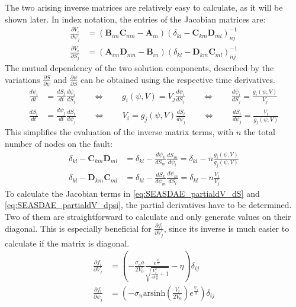\documentclass{report}
\begin{document}
The two arising inverse matrices are relatively easy to calculate, as it will be shown later. In index notation, the entries of the Jacobian matrices are:
\begin{align}
	\frac{\partial V_i}{\partial \psi_j} &= \left(\mathbf{B}_{im}\mathbf{C}_{mn}-\mathbf{A}_{in}\right)\left(\delta_{kl} - \mathbf{C}_{km}\mathbf{D}_{ml}\right)_{nj}^{-1} \\
	\frac{\partial V_i}{\partial S_j} &= \left(\mathbf{A}_{im}\mathbf{D}_{mn}-\mathbf{B}_{in}\right)\left(\delta_{kl} - \mathbf{D}_{km}\mathbf{C}_{ml}\right)_{nj}^{-1}
\end{align}
The mutual dependency of the two solution components, described by the variations $\frac{\partial S}{\partial \psi}$ and $\frac{\partial \psi}{\partial S}$ can be obtained using the respective time derivatives.
\begin{align}
\frac{d\psi_i}{dt} &= \frac{dS_j}{dt}\frac{d\psi_i}{dS_j} \qquad\Leftrightarrow\qquad g_i(\psi, V) = V_j \frac{d\psi_i}{dS_j} \qquad\Leftrightarrow\qquad \frac{d\psi_i}{dS_j} = \frac{g_i(\psi, V)}{V_j} \\
\frac{dS_i}{dt} &= \frac{d\psi_j}{dt}\frac{dS_i}{d\psi_j} \qquad\Leftrightarrow\qquad V_i = g_j(\psi, V) \frac{dS_i}{d\psi_j} \qquad\Leftrightarrow\qquad  \frac{dS_i}{d\psi_j} = \frac{V_i}{g_j(\psi, V)}
\end{align}
This simplifies the evaluation of the inverse matrix terms, with $n$ the total number of nodes on the fault: 
\begin{align}
	\delta_{kl} - \mathbf{C}_{km}\mathbf{D}_{ml} &= \delta_{kl} - \frac{d\psi_k}{dS_m}\frac{dS_m}{d\psi_l} = \delta_{kl} - n\frac{g_i(\psi,V)}{g_j(\psi,V)}\\
	\delta_{kl} - \mathbf{D}_{km}\mathbf{C}_{ml} &= \delta_{kl} - \frac{dS_k}{d\psi_m}\frac{d\psi_m}{dS_l} = \delta_{kl} - n\frac{V_i}{V_j}
\end{align}
To calculate the Jacobian terms in \autoref{eq:SEASDAE_partialdV_dS} and \autoref{eq:SEASDAE_partialdV_dpsi}, the partial derivatives have to be determined. Two of them are straightforward to calculate and only generate values on their diagonal. This is especially beneficial for $\frac{\partial f_i}{\partial V_j}$, since its inverse is much easier to calculate if the matrix is diagonal. 
\begin{align}
    \frac{\partial f_i}{\partial V_j} &= \left( -\frac{\sigma_na}{2V_0} \frac{e^{\frac{\psi_i}{a}}}{\sqrt{\frac{V_i^2}{4V_0^2}+1}}-\eta\right)\delta_{ij} \\
    \frac{\partial f_i}{\partial \psi_j} &= \left(-\sigma_n\text{arsinh}\left(\frac{V_i}{2V_0}\right)e^{\frac{\psi_i}{a}}\right)\delta_{ij}
\end{align}
\end{document}
